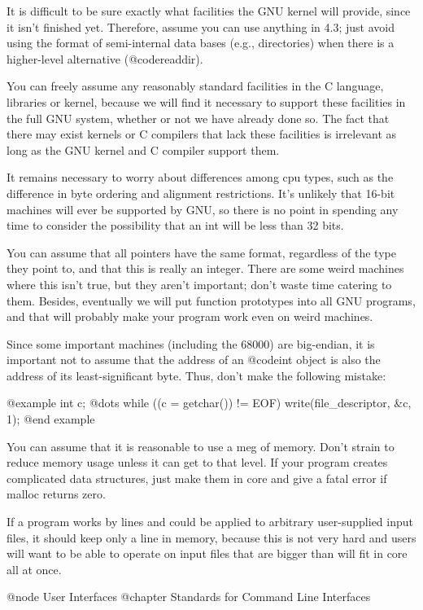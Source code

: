 It is difficult to be sure exactly what facilities the GNU kernel
will provide, since it isn't finished yet.  Therefore, assume you can
use anything in 4.3; just avoid using the format of semi-internal data
bases (e.g., directories) when there is a higher-level alternative
(@code{readdir}).

You can freely assume any reasonably standard facilities in the C
language, libraries or kernel, because we will find it necessary to
support these facilities in the full GNU system, whether or not we
have already done so.  The fact that there may exist kernels or C
compilers that lack these facilities is irrelevant as long as the GNU
kernel and C compiler support them.

It remains necessary to worry about differences among cpu types, such
as the difference in byte ordering and alignment restrictions.  It's
unlikely that 16-bit machines will ever be supported by GNU, so there
is no point in spending any time to consider the possibility that an
int will be less than 32 bits.

You can assume that all pointers have the same format, regardless
of the type they point to, and that this is really an integer.
There are some weird machines where this isn't true, but they aren't
important; don't waste time catering to them.  Besides, eventually
we will put function prototypes into all GNU programs, and that will
probably make your program work even on weird machines.

Since some important machines (including the 68000) are big-endian,
it is important not to assume that the address of an @code{int} object
is also the address of its least-significant byte.  Thus, don't
make the following mistake:

@example
int c;
@dots{}
while ((c = getchar()) != EOF)
        write(file_descriptor, &c, 1);
@end example

You can assume that it is reasonable to use a meg of memory.  Don't
strain to reduce memory usage unless it can get to that level.  If
your program creates complicated data structures, just make them in
core and give a fatal error if malloc returns zero.

If a program works by lines and could be applied to arbitrary
user-supplied input files, it should keep only a line in memory, because
this is not very hard and users will want to be able to operate on input
files that are bigger than will fit in core all at once.


@node User Interfaces
@chapter Standards for Command Line Interfaces

